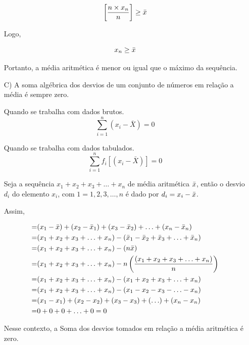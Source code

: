\begin{enumerate}
\begin{equation*}\label{propriedade1}
\left[ \frac{n \times x_{n}}{n} \right ] \geq \Bar{x}
\end{equation*}

Logo,

\begin{equation*}\label{propriedade1}
x_{n} \geq \Bar{x}
\end{equation*}

Portanto, a média aritmética é menor ou igual que o máximo da sequência.



\item [{C)}] A soma algébrica dos desvios de um conjunto de números em relação a média é sempre zero.\vskip0.3cm

Quando se trabalha com dados brutos.
$$ \sum_{i=1}^{n}(x_{i}-\bar{X})=0 $$


Quando se trabalha com dados tabulados.
$$ \sum_{i=1}^{n}f_{i}[(x_{i}-\bar{X})]=0 $$



\textbf{} 
\vskip0.3cm

Seja a sequência  $x_{1}+x_{2}+x_{3}+\ldots+x_{n}$ de média aritmética $\Bar{x}$, então o desvio $d_{i}$ do elemento $x_{i}$, com $1=1,2,3,\ldots,n$ é dado por $d_{i}=x_{i}-\Bar{x}$.
\vskip0.3cm


Assim, 

\begin{eqnarray*}
= & (x_{1}-\Bar{x})+(x_{2}-\Bar{x}_{1})+(x_{3}-\Bar{x}_{2})+\ldots+(x_{n}-\Bar{x}_{n}) \\
= & (x_{1}+x_{2}+x_{3}+\ldots+x_{n}) - (\Bar{x}_{1}-\Bar{x}_{2}+\Bar{x}_{3}+\ldots+\Bar{x}_{n})\\
= & (x_{1}+x_{2}+x_{3}+\ldots+x_{n})-(n\Bar{x})\\
= & (x_{1}+x_{2}+x_{3}+\ldots+x_{n})-n \left(\frac{(x_{1}+x_{2}+x_{3}+\ldots+x_{n})}{n} \right)\\
= & (x_{1}+x_{2}+x_{3}+\ldots+x_{n})-(x_{1}+x_{2}+x_{3}+\ldots+x_{n})\\
= & (x_{1}+x_{2}+x_{3}+\ldots+x_{n})-(x_{1}-x_{2}-x_{3}-\ldots-x_{n})\\
= & (x_{1}-x_{1})+(x_{2}-x_{2})+(x_{3}-x_{3})+(\ldots)+(x_{n}-x_{n})\\
= & 0+0+0+\ldots+0=0
\end{eqnarray*}

Nesse contexto, a Soma dos desvios tomados em relação a média aritmética é zero.





\end{enumerate}
